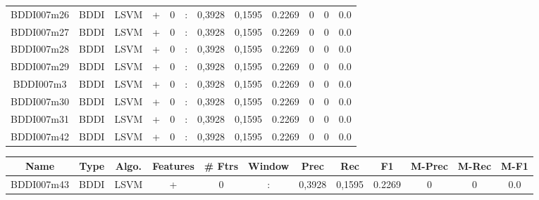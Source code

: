 \documentclass[a4paper]{article}
\begin{document}
\begin{landscape}
\begin{center}
\begin{tabular}{ |c|c|c|c|c|c|c|c|c|c|c|c|}
 
 	
 	\small{ BDDI007m26 } & BDDI & LSVM & +  &  0 &  :  &  0,3928 & 0,1595 & 0.2269  &  0 & 0 & 0.0 \\
 	

 
 	
 	\small{ BDDI007m27 } & BDDI & LSVM & +  &  0 &  :  &  0,3928 & 0,1595 & 0.2269  &  0 & 0 & 0.0 \\
 	

 
 	
 	\small{ BDDI007m28 } & BDDI & LSVM & +  &  0 &  :  &  0,3928 & 0,1595 & 0.2269  &  0 & 0 & 0.0 \\
 	

 
 	
 	\small{ BDDI007m29 } & BDDI & LSVM & +  &  0 &  :  &  0,3928 & 0,1595 & 0.2269  &  0 & 0 & 0.0 \\
 	

 
 	
 	\small{ BDDI007m3 } & BDDI & LSVM & +  &  0 &  :  &  0,3928 & 0,1595 & 0.2269  &  0 & 0 & 0.0 \\
 	

 
 	
 	\small{ BDDI007m30 } & BDDI & LSVM & +  &  0 &  :  &  0,3928 & 0,1595 & 0.2269  &  0 & 0 & 0.0 \\
 	

 
 	
 	\small{ BDDI007m31 } & BDDI & LSVM & +  &  0 &  :  &  0,3928 & 0,1595 & 0.2269  &  0 & 0 & 0.0 \\
 	

 
 	
 	\small{ BDDI007m42 } & BDDI & LSVM & +  &  0 &  :  &  0,3928 & 0,1595 & 0.2269  &  0 & 0 & 0.0 \\
 	
 \hline
\end{tabular}
\end{center}




\begin{center}
\begin{tabular}{ |c|c|c|c|c|c|c|c|c|c|c|c|} 
 \hline
 	Name & Type & Algo. & Features & \# Ftrs & Window & Prec & Rec & F1 & M-Prec & M-Rec & M-F1\\
 \hline

 	

 
 	
 	\small{ BDDI007m43 } & BDDI & LSVM & +  &  0 &  :  &  0,3928 & 0,1595 & 0.2269  &  0 & 0 & 0.0 \\
 	


\end{tabular}
\end{center}
\end{landscape}
\end{document}
